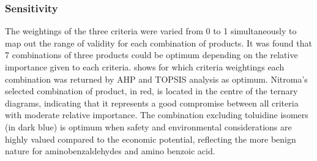 
\subsubsection{Sensitivity}

The weightings of the three criteria were varied from 0 to 1 simultaneously to map out the range of validity for each combination of products. It was found that 7 combinations of three products could be optimum depending on the relative importance given to each criteria.  shows for which criteria weightings each combination was returned by AHP and TOPSIS analysis as optimum. Nitroma's selected combination of product, in red, is located in the centre of the ternary diagrams, indicating that it represents a good compromise between all criteria with moderate relative importance. The combination excluding toluidine isomers (in dark blue) is optimum when safety and environmental considerations are highly valued compared to the economic potential, reflecting the more benign nature for aminobenzaldehydes and amino benzoic acid. 

